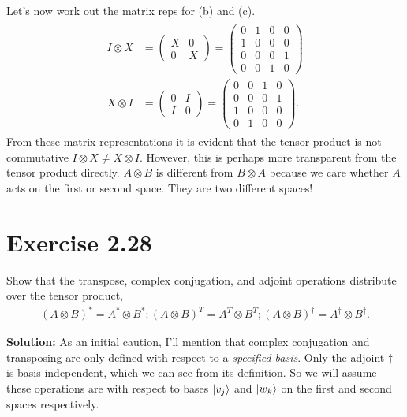 \documentclass{book}
\begin{document}
    Let's now work out the matrix reps for (b) and (c).
    \begin{align}
    \begin{aligned}
        I\otimes X &= \begin{pmatrix}
            X & 0 \\
            0 & X
        \end{pmatrix} = \begin{pmatrix}
            0 & 1 & 0 & 0 \\
            1 & 0 & 0 & 0 \\
            0 & 0 & 0 & 1 \\
            0 & 0 & 1 & 0
        \end{pmatrix} \\
        X \otimes I &= \begin{pmatrix}
            0 & I \\
            I & 0
        \end{pmatrix} = \begin{pmatrix}
            0 & 0 & 1 & 0 \\
            0 & 0 & 0 & 1 \\
            1 & 0 & 0 & 0 \\
            0 & 1 & 0 & 0
        \end{pmatrix}.
    \end{aligned}
    \end{align}
    From these matrix representations it is evident that the tensor product is not commutative $I \otimes X \neq X \otimes I$. However, this is perhaps more transparent from the tensor product directly. $A\otimes B$ is different from $B \otimes A$ because we care whether $A$ acts on the first or second space. They are two different spaces!
    
\section{Exercise 2.28}
    Show that the transpose, complex conjugation, and adjoint operations distribute over the tensor product,
    \begin{align}
        (A\otimes B)^* = A^* \otimes B^*; (A\otimes B)^T = A^T \otimes B^T; (A\otimes B)^\dagger = A^\dagger \otimes B^\dagger.
    \end{align}
    
    \textbf{Solution:} As an initial caution, I'll mention that complex conjugation and transposing are only defined with respect to a \emph{specified basis}. Only the adjoint $\dagger$ is basis independent, which we can see from its definition. So we will assume these operations are with respect to bases $\ket{v_j}$ and $\ket{w_k}$ on the first and second spaces respectively. 
    
\end{document}
